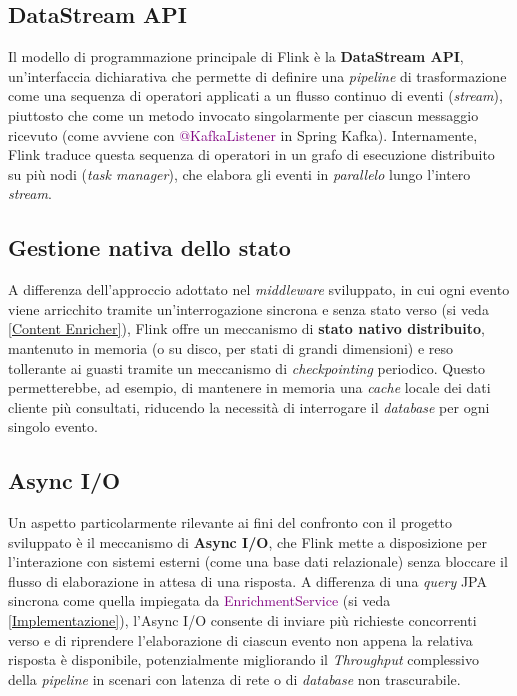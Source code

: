 \subsection{DataStream API}
Il modello di programmazione principale di Flink è la \textbf{DataStream API}, un'interfaccia dichiarativa che permette di definire una \textit{pipeline} di trasformazione come una sequenza di operatori applicati a un flusso continuo di eventi (\textit{stream}), piuttosto che come un metodo invocato singolarmente per ciascun messaggio ricevuto (come avviene con \textcolor{purple}{@KafkaListener} in Spring Kafka). Internamente, Flink traduce questa sequenza di operatori in un grafo di esecuzione distribuito su più nodi (\textit{task manager}), che elabora gli eventi in \textit{parallelo} lungo l'intero \textit{stream}.

\subsection{Gestione nativa dello stato}
A differenza dell'approccio adottato nel \textit{middleware} sviluppato, in cui ogni evento viene arricchito tramite un'interrogazione sincrona e senza stato verso  (si veda \ref{Content Enricher}), Flink offre un meccanismo di \textbf{stato nativo distribuito}, mantenuto in memoria (o su disco, per stati di grandi dimensioni) e reso tollerante ai guasti tramite un meccanismo di \textit{checkpointing} periodico. Questo permetterebbe, ad esempio, di mantenere in memoria una \textit{cache} locale dei dati cliente più consultati, riducendo la necessità di interrogare il \textit{database} per ogni singolo evento.

\subsection{Async I/O}
Un aspetto particolarmente rilevante ai fini del confronto con il progetto sviluppato è il meccanismo di \textbf{Async I/O}, che Flink mette a disposizione per l'interazione con sistemi esterni (come una base dati relazionale) senza bloccare il flusso di elaborazione in attesa di una risposta. A differenza di una \textit{query} \acrshort{JPA} sincrona come quella impiegata da \textcolor{purple}{EnrichmentService} (si veda \ref{Implementazione}), l'Async I/O consente di inviare più richieste concorrenti verso  e di riprendere l'elaborazione di ciascun evento non appena la relativa risposta è disponibile, potenzialmente migliorando il \textit{\gls{Throughput}} complessivo della \textit{pipeline} in scenari con latenza di rete o di \textit{database} non trascurabile.

